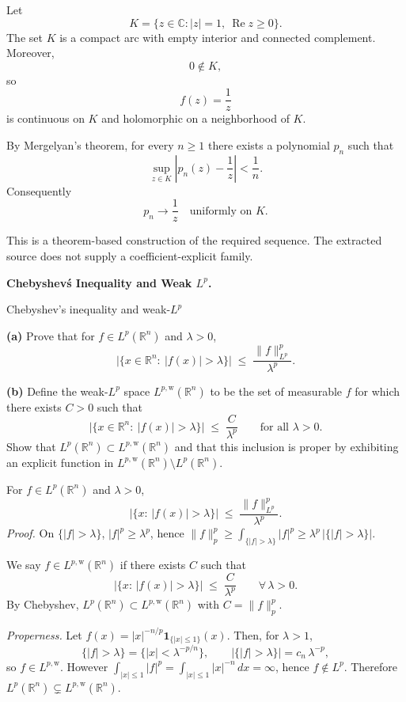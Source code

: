 \begin{solution}
Let
\[
K
=
\{z\in\mathbb C:|z|=1,\ \operatorname{Re}z\ge0\}.
\]
The set \(K\) is a compact arc with empty interior and connected complement. Moreover,
\[
0\notin K,
\]
so
\[
f(z)=\frac1z
\]
is continuous on \(K\) and holomorphic on a neighborhood of \(K\).

By Mergelyan's theorem, for every \(n\ge1\) there exists a polynomial \(p_n\) such that
\[
\sup_{z\in K}
\left|
p_n(z)-\frac1z
\right|
<
\frac1n.
\]
Consequently
\[
\boxed{
p_n\longrightarrow\frac1z
\quad\text{uniformly on }K.
}
\]

This is a theorem-based construction of the required sequence. The extracted source does not
supply a coefficient-explicit family.
\end{solution}


\begin{problem}[CP-II-0510]
\label{prob:cp-ii-0510}
\textbf{Chebyshev\'s Inequality and Weak \(L^p\).}

\hspace*{1.5em}Chebyshev's inequality and weak-$L^p$

\textbf{(a)} Prove that for $f\in L^p(\mathbb{R}^n)$ and $\lambda>0$,
\[
\big|\{x\in\mathbb{R}^n:\ |f(x)|>\lambda\}\big|
\;\le\; \frac{\|f\|_{L^p}^p}{\lambda^p}.
\]

\medskip
\textbf{(b)} Define the weak-$L^p$ space $L^{p,\mathrm{w}}(\mathbb{R}^n)$ to be the set of measurable
$f$ for which there exists $C>0$ such that
\[
\big|\{x\in\mathbb{R}^n:\ |f(x)|>\lambda\}\big|
\;\le\; \frac{C}{\lambda^p}\qquad\text{for all }\lambda>0.
\]
Show that $L^p(\mathbb{R}^n)\subset L^{p,\mathrm{w}}(\mathbb{R}^n)$ and that this inclusion is proper by
exhibiting an explicit function in $L^{p,\mathrm{w}}(\mathbb{R}^n)\setminus L^p(\mathbb{R}^n)$.

For $f\in L^p(\mathbb{R}^n)$ and $\lambda>0$,
\[
\big|\{x:\,|f(x)|>\lambda\}\big|
\;\le\; \frac{\|f\|_{L^p}^p}{\lambda^p}.
\]
\emph{Proof.} On $\{|f|>\lambda\}$, $|f|^p\ge \lambda^p$, hence
$\|f\|_p^p \ge \int_{\{|f|>\lambda\}} |f|^p \ge \lambda^p\,|\{|f|>\lambda\}|$.

We say $f\in L^{p,\mathrm{w}}(\mathbb{R}^n)$ if there exists $C$ such that
\[
\big|\{x:\,|f(x)|>\lambda\}\big| \;\le\; \frac{C}{\lambda^p}
\qquad\forall\,\lambda>0.
\]
By Chebyshev, $L^p(\mathbb{R}^n)\subset L^{p,\mathrm{w}}(\mathbb{R}^n)$ with $C=\|f\|_p^p$.

\emph{Properness.} Let $f(x)=|x|^{-n/p}\mathbf 1_{\{|x|\le 1\}}(x)$. Then, for $\lambda>1$,
\[
\{ |f|>\lambda \}=\{ |x|<\lambda^{-p/n}\}, \qquad
\big|\{|f|>\lambda\}\big| = c_n\,\lambda^{-p},
\]
so $f\in L^{p,\mathrm{w}}$. However
$\displaystyle \int_{|x|\le1}|f|^p=\int_{|x|\le1} |x|^{-n}\,dx=\infty$,
hence $f\notin L^p$. Therefore $L^p(\mathbb{R}^n)\subsetneq L^{p,\mathrm{w}}(\mathbb{R}^n)$.

\clearpage

\clearpage
\end{problem}

